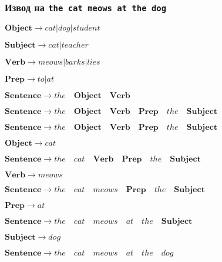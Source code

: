 \documentclass{beamer}
\begin{document}
  
  \begin{frame}[fragile]
  \frametitle{Извод на \texttt{the cat meows at the dog}}
  
  
  \begin{flushright}
  
  
  $\mathbf{Object} \rightarrow cat | dog | student$
  
  $\mathbf{Subject} \rightarrow cat | teacher$
  
  $\mathbf{Verb} \rightarrow meows | barks | lies$
  
  $\mathbf{Prep} \rightarrow to | at$
  
  $\mathbf{Sentence} \rightarrow the  \quad \mathbf{Object} \quad  \mathbf{Verb}$
  
  $\mathbf{Sentence} \rightarrow the \quad \mathbf{Object}  \quad\mathbf{Verb}  \quad\mathbf{Prep} \quad the \quad \mathbf{Subject}$
  
  \end{flushright}
  
  
  \vspace{0.2cm}
  \pause
  
  $\mathbf{Sentence} \rightarrow the \quad \mathbf{Object}  \quad\mathbf{Verb}  \quad\mathbf{Prep} \quad the \quad \mathbf{Subject}$
  
  \pause
  
  \begin{flushright}
  $\mathbf{Object} \rightarrow cat$
  \end{flushright}
  
  $\mathbf{Sentence} \rightarrow the \quad cat \quad\mathbf{Verb}  \quad\mathbf{Prep} \quad the \quad \mathbf{Subject}$
  
  
  
  \pause
  
  \begin{flushright}
  $\mathbf{Verb} \rightarrow meows$
  \end{flushright}
  
  $\mathbf{Sentence} \rightarrow the \quad cat \quad meows  \quad\mathbf{Prep} \quad the \quad \mathbf{Subject}$
  
  \pause
  
  \begin{flushright}
  $\mathbf{Prep} \rightarrow at$
  \end{flushright}
  
  $\mathbf{Sentence} \rightarrow the \quad cat \quad meows  \quad at \quad the \quad \mathbf{Subject}$
  
  
  
  \pause
  
  \begin{flushright}
  $\mathbf{Subject} \rightarrow dog$
  \end{flushright}
  
  $\mathbf{Sentence} \rightarrow the \quad cat \quad meows  \quad at \quad the \quad dog$
  
  
  \end{frame}
  
\end{document}
